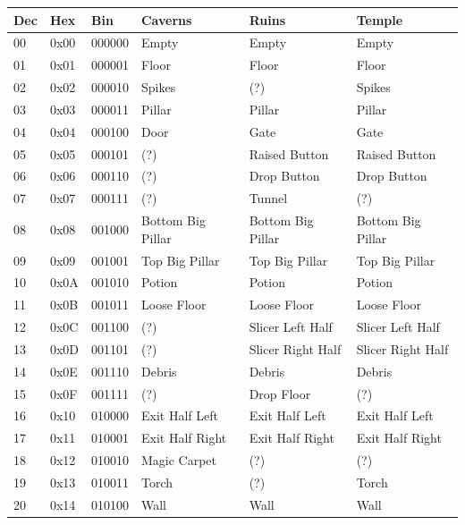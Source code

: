 \documentclass{article}
\begin{document}
\begin{table}
\begin{tabular}{llllll}
\hline
 Dec& Hex  & Bin    & Caverns            & Ruins             & Temple \\
\hline
 00 & 0x00 & 000000 & Empty              & Empty             & Empty \\
 01 & 0x01 & 000001 & Floor              & Floor             & Floor \\
 02 & 0x02 & 000010 & Spikes             & (?)               & Spikes \\
 03 & 0x03 & 000011 & Pillar             & Pillar            & Pillar \\
 04 & 0x04 & 000100 & Door               & Gate              & Gate \\
 05 & 0x05 & 000101 & (?)                & Raised Button     & Raised Button \\
 06 & 0x06 & 000110 & (?)                & Drop Button       & Drop Button \\
 07 & 0x07 & 000111 & (?)                & Tunnel            & (?) \\
 08 & 0x08 & 001000 & Bottom Big Pillar  & Bottom Big Pillar & Bottom Big Pillar \\
 09 & 0x09 & 001001 & Top Big Pillar     & Top Big Pillar    & Top Big Pillar \\
 10 & 0x0A & 001010 & Potion             & Potion            & Potion \\
 11 & 0x0B & 001011 & Loose Floor        & Loose Floor       & Loose Floor \\
 12 & 0x0C & 001100 & (?)                & Slicer Left Half  & Slicer Left Half \\
 13 & 0x0D & 001101 & (?)                & Slicer Right Half & Slicer Right Half \\
 14 & 0x0E & 001110 & Debris             & Debris            & Debris \\
 15 & 0x0F & 001111 & (?)                & Drop Floor        & (?) \\
 16 & 0x10 & 010000 & Exit Half Left     & Exit Half Left    & Exit Half Left \\
 17 & 0x11 & 010001 & Exit Half Right    & Exit Half Right   & Exit Half Right \\
 18 & 0x12 & 010010 & Magic Carpet       & (?)               & (?) \\
 19 & 0x13 & 010011 & Torch              & (?)               & Torch \\
 20 & 0x14 & 010100 & Wall               & Wall              & Wall \\

\end{tabular}
\end{table}
\end{document}
